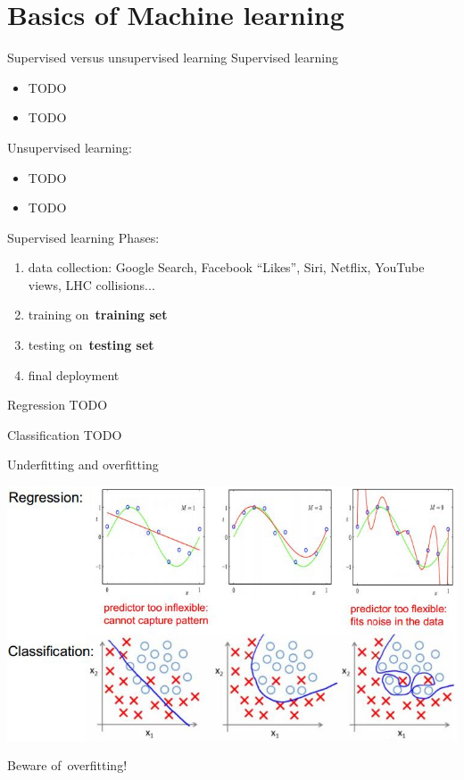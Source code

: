 \documentclass{beamer}
\newcommand{\todo}{\alert{TODO}}
\begin{document}

  \section{Basics of Machine learning}

  \begin{frame}{Supervised versus unsupervised learning}
    Supervised learning
    \begin{itemize}[<+- | alert@+>]
      \item \todo
      \item \todo
    \end{itemize}
    \pause

    Unsupervised learning:
    \begin{itemize}[<+- | alert@+>]
      \item \todo
      \item \todo
    \end{itemize}
  \end{frame}

  \begin{frame}{Supervised learning}
    Phases:
    \pause
    \begin{enumerate}[<+- | alert@+>]
      \item data collection: Google Search, Facebook ``Likes'', Siri, Netflix, YouTube views, LHC collisions...
      \item training on~\textbf{training set}
      \item testing on~\textbf{testing set}
      \item final deployment
    \end{enumerate}
    \pause
  \end{frame}

  \begin{frame}{Regression}
    \todo
  \end{frame}

  \begin{frame}{Classification}
    \todo
  \end{frame}

  {
    \begin{frame}{Underfitting and overfitting}
      \begin{center}
        \includegraphics[width=.75\textwidth]{../img/underfitting_and_overfitting.jpg}
        \pause

        Beware of~overfitting!
      \end{center}
    \end{frame}
  }
\end{document}
